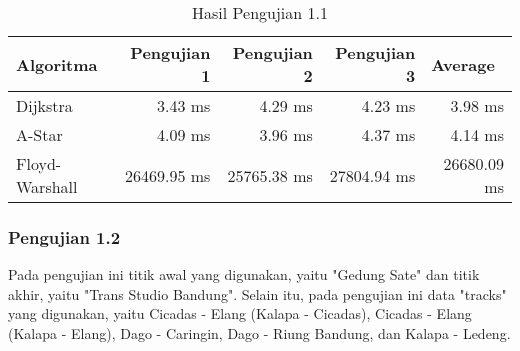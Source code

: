 \renewcommand{\arraystretch}{1.8}
\begin{table}[H]
\centering
\caption{Hasil Pengujian 1.1}
\label{tab:hasiluji1.1}
{\large
\begin{tabular}{|l|r|r|r|r|} 
\hline
{\textbf{Algoritma}} & {\textbf{Pengujian 1}} & {\textbf{Pengujian 2}} & {\textbf{Pengujian 3}} & \multicolumn{1}{l|}{\textbf{Average}} \\ 
\hline
Dijkstra       & 3.43 ms              & 4.29 ms              & 4.23 ms              & 3.98 ms          \\
\hline
A-Star         & 4.09 ms              & 3.96 ms              & 4.37 ms              & 4.14 ms          \\
\hline
Floyd-Warshall & 26469.95 ms          & 25765.38 ms          & 27804.94 ms          & 26680.09 ms \\
\hline
\end{tabular}
}
\end{table}

\subsubsection{Pengujian 1.2}
Pada pengujian ini titik awal yang digunakan, yaitu "Gedung Sate" dan titik akhir, yaitu "Trans Studio Bandung". Selain itu, pada pengujian ini data "tracks" yang digunakan, yaitu Cicadas - Elang (Kalapa - Cicadas), Cicadas - Elang (Kalapa - Elang), Dago - Caringin, Dago - Riung Bandung, dan Kalapa - Ledeng.

\begin{comment}
\begin{table}[H]
\centering
\caption{Data Pengujian 1.2}
\label{tab:data1.2}
{\large
\begin{tabular}{|l|l|}
\hline
\textbf{trackId}       & \textbf{trackName}             \\ \hline
cicadaselangkalapacicadas & Cicadas - Elang (Kalapa - Cicadas) \\ \hline
cicadaselangkalapaelang & Cicadas - Elang (Kalapa - Elang) \\ \hline
dagocaringin   & Dago - Caringin     \\ \hline
dagoriungbandung        & Dago - Riung Bandung             \\ \hline
kalapaledeng        & Kalapa - Ledeng             \\ \hline
\end{tabular}
}
\end{table}
\end{comment}

